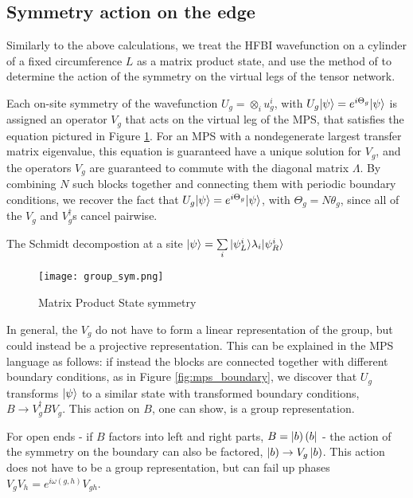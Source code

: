 \subsection{Symmetry action on the edge}
\label{sec:symmetry}

Similarly to the above calculations, we treat the HFBI wavefunction on a 
cylinder of a fixed circumference $L$ as a matrix product state, and use the 
method of  to determine the action of the symmetry on 
the virtual legs of the tensor network.

Each on-site symmetry of the wavefunction $U_g = \otimes_i u^i_g$, with $U_g 
\vert \psi \rangle = e^{i \Theta_g} \vert \psi \rangle$ is assigned an operator $V_g$ that 
acts on the virtual leg of the MPS, that satisfies the equation pictured in 
Figure \ref{fig:mps_group_sym}. For an MPS with a nondegenerate largest 
transfer matrix eigenvalue, this equation is guaranteed have a unique solution 
for $V_g$, and the operators $V_g$ are guaranteed to commute with the diagonal matrix $\Lambda$. By combining $N$ such blocks together and connecting them with periodic boundary conditions, we recover the fact that $U_g 
\vert \psi \rangle = e^{i \Theta_g} \vert \psi \rangle$, with $\Theta_g = N \theta_g$, since 
all of the $V_g$ and $V_g^{\dagger}$s cancel pairwise.

The Schmidt decompostion at a site $\vert \psi \rangle = \sum\limits_i \vert \psi_L^i \rangle \lambda_i \vert \psi_R^i \rangle$      

\begin{figure}[htbc]
    \centering
    \texttt{[image: group\_sym.png]}
    \caption{Matrix Product State symmetry }
    \label{fig:mps_group_sym}
\end{figure}

In general, the $V_g$ do not have to form a linear representation of the 
group, but could instead be a projective representation. This can be explained 
in the MPS language as follows: if instead the blocks are connected together 
with different boundary conditions, as in Figure \ref{fig:mps_boundary}, we 
discover that $U_g$ transforms $\vert \psi \rangle$ to a similar state with 
transformed boundary conditions, $B \rightarrow V_g^{\dagger} B V_g$. This 
action on $B$, one can show, is a group representation.

For open ends - if $B$ factors into left and right parts, $B = 
\left |b \right )\left ( b \right |$ - the action of the symmetry on the boundary can also be 
factored, $\left |b \right ) \rightarrow V_g \left |b \right )$. This action does not have to be 
a group representation, but can fail up phases $V_g V_h = e^{i \omega(g, h)} 
V_{gh}$.  

